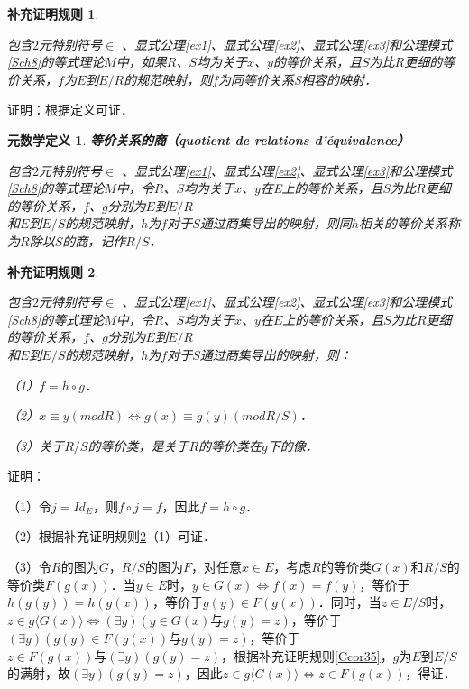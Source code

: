 \documentclass[12pt, a4paper, oneside]{book}
\newtheorem{metadef}{元数学定义}
\newtheorem{Ccor}{补充证明规则}
\begin{document}
			\begin{Ccor}\label{Ccor57}
				\hfill\par
				包含$2$元特别符号$\in$ 、显式公理\ref{ex1}、显式公理\ref{ex2}、显式公理\ref{ex3}和公理模式\ref{Sch8}的等式理论$M$中，如果$R$、$S$均为关于$x$、$y$的等价关系，且$S$为比$R$更细的等价关系，$f$为$E$到$E/R$的规范映射，则$f$为同等价关系S相容的映射．
			\end{Ccor}
			证明：根据定义可证．
			
			\begin{metadef}
				\textbf{等价关系的商（quotient de relations d'équivalence）}
				\par
				包含$2$元特别符号$\in$ 、显式公理\ref{ex1}、显式公理\ref{ex2}、显式公理\ref{ex3}和公理模式\ref{Sch8}的等式理论$M$中，令$R$、$S$均为关于$x$、$y$在E上的等价关系，且$S$为比$R$更细的等价关系，$f$、$g$分别为$E$到$E/R$\\和$E$到$E/S$的规范映射，$h$为$f$对于$S$通过商集导出的映射，则同$h$相关的等价关系称为$R$除以$S$的商，记作$R/S$．
			\end{metadef}
			
			\begin{Ccor}\label{Ccor58}
				\hfill\par
				包含$2$元特别符号$\in$ 、显式公理\ref{ex1}、显式公理\ref{ex2}、显式公理\ref{ex3}和公理模式\ref{Sch8}的等式理论$M$中，令$R$、$S$均为关于$x$、$y$在$E$上的等价关系，且$S$为比$R$更细的等价关系，$f$、$g$分别为$E$到$E/R$\\和$E$到$E/S$的规范映射，$h$为$f$对于$S$通过商集导出的映射，则：
				\par
				（1）$f=h\circ g$．
				\par
				（2）$x\equiv y(mod R)\Leftrightarrow g(x)\equiv g(y)(mod R/S)$．
				\par
				（3）关于$R/S$的等价类，是关于$R$的等价类在$g$下的像．
			\end{Ccor}
			证明：
			\par
			（1）令$j=Id_E$，则$f\circ j=f$，因此$f=h\circ g$．
			\par
			（2）根据补充证明规则\ref{Ccor58}（1）可证．
			\par
			（3）令$R$的图为$G$，$R/S$的图为$F$，对任意$x\in E$，考虑$R$的等价类$G(x)$和$R/S$的等价类$F(g(x))$．当$y\in E$时，$y\in G(x)\Leftrightarrow f(x)=f(y)$，等价于$h(g(y))=h(g(x))$，等价于$g(y)\in F(g(x))$．同时，当$z\in E/S$时，$z\in g\langle G(x)\rangle\Leftrightarrow (\exists y)(y\in G(x)\text{与}g(y)=z)$，等价于$(\exists y)(g(y)\in F(g(x))\text{与}g(y)=z)$，等价于$z\in F(g(x))\text{与}(\exists y)(g(y)=z)$，根据补充证明规则\ref{Ccor35}，$g$为$E$到$E/S$的满射，故$(\exists y)(g(y)=z)$，因此$z\in g\langle G(x)\rangle\Leftrightarrow z\in F(g(x))$，得证．
			
\end{document}
